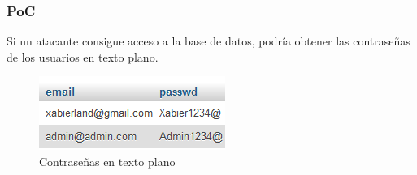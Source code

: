 \documentclass{report}
\begin{document}
                \subsubsection{PoC}
                    Si un atacante consigue acceso a la base de datos, podría obtener las contraseñas de los usuarios en texto plano.
                    \begin{figure}[H]
                        \centering
                        \includegraphics[width=\textwidth]{./img/vulnerabilidades/3.2/2.1.png}
                        \caption{Contraseñas en texto plano}
                    \end{figure}
\end{document}
